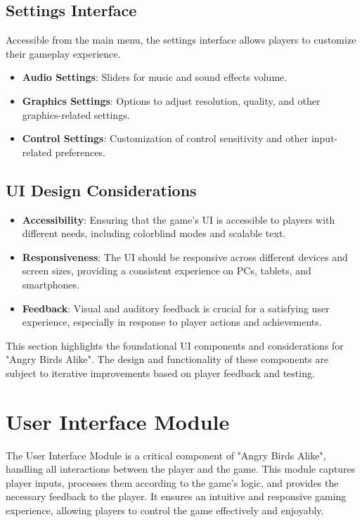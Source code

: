 \documentclass[12pt]{article}
\begin{document}
\subsection{Settings Interface}
Accessible from the main menu, the settings interface allows players to customize their gameplay experience.
\begin{itemize}
    \item \textbf{Audio Settings}: Sliders for music and sound effects volume.
    \item \textbf{Graphics Settings}: Options to adjust resolution, quality, and other graphics-related settings.
    \item \textbf{Control Settings}: Customization of control sensitivity and other input-related preferences.
\end{itemize}

\subsection{UI Design Considerations}
\begin{itemize}
    \item \textbf{Accessibility}: Ensuring that the game's UI is accessible to players with different needs, including colorblind modes and scalable text.
    \item \textbf{Responsiveness}: The UI should be responsive across different devices and screen sizes, providing a consistent experience on PCs, tablets, and smartphones.
    \item \textbf{Feedback}: Visual and auditory feedback is crucial for a satisfying user experience, especially in response to player actions and achievements.
\end{itemize}

This section highlights the foundational UI components and considerations for "Angry Birds Alike". The design and functionality of these components are subject to iterative improvements based on player feedback and testing.

\section{User Interface Module}
The User Interface Module is a critical component of "Angry Birds Alike", handling all interactions between the player and the game. This module captures player inputs, processes them according to the game's logic, and provides the necessary feedback to the player. It ensures an intuitive and responsive gaming experience, allowing players to control the game effectively and enjoyably.
\end{document}
